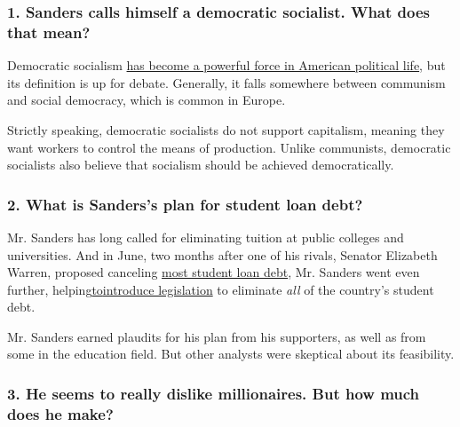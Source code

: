 \hypertarget{1-sanders-calls-himself-a-democratic-socialist-what-does-that-mean}{%
\subsubsection{\texorpdfstring{\textbf{1. Sanders calls himself a
democratic socialist. What does that
mean?}}{1. Sanders calls himself a democratic socialist. What does that mean?}}\label{1-sanders-calls-himself-a-democratic-socialist-what-does-that-mean}}

Democratic socialism
\href{https://www.nytimes3xbfgragh.onion/2019/06/12/us/politics/democratic-socialism-facts-history.html}{has
become a powerful force in American political life}, but its definition
is up for debate. Generally, it falls somewhere between communism and
social democracy, which is common in Europe.

Strictly speaking, democratic socialists do not support capitalism,
meaning they want workers to control the means of production. Unlike
communists, democratic socialists also believe that socialism should be
achieved democratically.

\hypertarget{2-what-is-sanderss-plan-for-student-loan-debt}{%
\subsubsection{\texorpdfstring{\textbf{2. What is Sanders's plan for
student loan
debt?}}{2. What is Sanders's plan for student loan debt?}}\label{2-what-is-sanderss-plan-for-student-loan-debt}}

Mr. Sanders has long called for eliminating tuition at public colleges
and universities. And in June, two months after one of his rivals,
Senator Elizabeth Warren, proposed canceling
\href{https://www.nytimes3xbfgragh.onion/2019/04/22/us/politics/elizabeth-warren-student-debt.html}{most
student loan debt}, Mr. Sanders went even further,
helping\href{https://www.nytimes3xbfgragh.onion/2019/06/24/us/politics/bernie-sanders-student-debt.html}{to}\href{https://www.nytimes3xbfgragh.onion/2019/06/24/us/politics/bernie-sanders-student-debt.html}{introduce
legislation} to eliminate \emph{all} of the country's student debt.

Mr. Sanders earned plaudits for his plan from his supporters, as well as
from some in the education field. But other analysts were skeptical
about its feasibility.

\hypertarget{3-he-seems-to-really-dislike-millionaires-but-how-much-does-he-make}{%
\subsubsection{\texorpdfstring{\textbf{3. He seems to really dislike
millionaires. But how much does he
make?}}{3. He seems to really dislike millionaires. But how much does he make?}}\label{3-he-seems-to-really-dislike-millionaires-but-how-much-does-he-make}}


